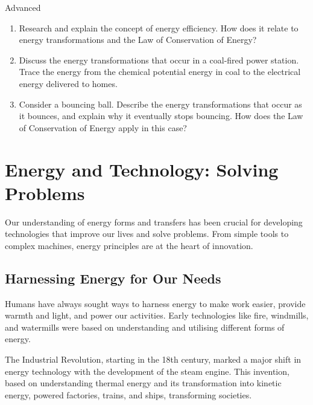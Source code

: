 \begin{marginnote}
\begin{tieredquestions}{Advanced}
\begin{enumerate}
    \item Research and explain the concept of energy efficiency. How does it relate to energy transformations and the Law of Conservation of Energy?
    \item Discuss the energy transformations that occur in a coal-fired power station.  Trace the energy from the chemical potential energy in coal to the electrical energy delivered to homes.
    \item Consider a bouncing ball.  Describe the energy transformations that occur as it bounces, and explain why it eventually stops bouncing.  How does the Law of Conservation of Energy apply in this case?
\end{enumerate}
\end{tieredquestions}


\section{Energy and Technology: Solving Problems}

Our understanding of energy forms and transfers has been crucial for developing technologies that improve our lives and solve problems.  From simple tools to complex machines, energy principles are at the heart of innovation.

\subsection{Harnessing Energy for Our Needs}

Humans have always sought ways to harness energy to make work easier, provide warmth and light, and power our activities.  Early technologies like fire, windmills, and watermills were based on understanding and utilising different forms of energy.


The Industrial Revolution, starting in the 18th century, marked a major shift in energy technology with the development of the steam engine.  This invention, based on understanding thermal energy and its transformation into kinetic energy, powered factories, trains, and ships, transforming societies.


\end{marginnote}
